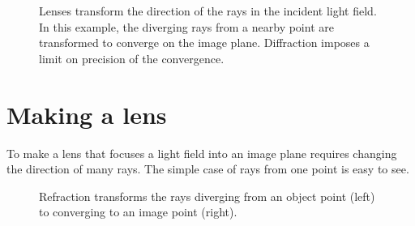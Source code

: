 \documentclass[
  letterpaper,
]{book}
\begin{document}
\begin{figure}


\caption{\label{fig-pinhole-rays}Lenses transform the direction of the
rays in the incident light field. In this example, the diverging rays
from a nearby point are transformed to converge on the image plane.
Diffraction imposes a limit on precision of the convergence.}

\end{figure}%

\section{Making a lens}\label{making-a-lens}

To make a lens that focuses a light field into an image plane requires
changing the direction of many rays. The simple case of rays from one
point is easy to see.

\begin{figure}


\caption{\label{fig-thinlens-prism}Refraction transforms the rays
diverging from an object point (left) to converging to an image point
(right).}

\end{figure}%
\end{document}
